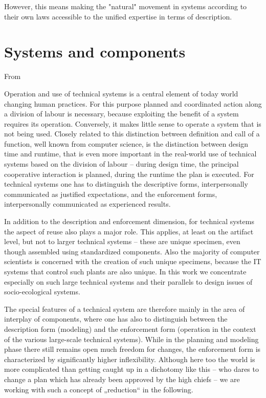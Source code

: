 \documentclass[11pt,a4paper]{article}
\begin{document}
However, this means making the "natural" movement in systems according to
their own laws accessible to the unified expertise in terms of description.

\section{Systems and components}

From \cite{Graebe2020}

Operation and use of technical systems is a central element of today world
changing human practices. For this purpose planned and coordinated action
along a division of labour is necessary, because exploiting the benefit of a
system requires its operation. Conversely, it makes little sense to operate a
system that is not being used. Closely related to this distinction between
definition and call of a function, well known from computer science, is the
distinction between design time and runtime, that is even more important in
the real-world use of technical systems based on the division of labour –
during design time, the principal cooperative interaction is planned, during
the runtime the plan is executed. For technical systems one has to distinguish
the descriptive forms, interpersonally communicated as justified expectations,
and the enforcement forms, interpersonally communicated as experienced
results.

In addition to the description and enforcement dimension, for technical
systems the aspect of reuse also plays a major role. This applies, at least on
the artifact level, but not to larger technical systems – these are unique
specimen, even though assembled using standardized components. Also the
majority of computer scientists is concerned with the creation of such unique
specimens, because the IT systems that control such plants are also unique. In
this work we concentrate especially on such large technical systems and their
parallels to design issues of socio-ecological systems.

The special features of a technical system are therefore mainly in the area of
interplay of components, where one has also to distinguish between the
description form (modeling) and the enforcement form (operation in the context
of the various large-scale technical systems). While in the planning and
modeling phase there still remains open much freedom for changes, the
enforcement form is characterized by significantly higher
inflexibility. Although here too the world is more complicated than getting
caught up in a dichotomy like this – who dares to change a plan which has
already been approved by the high chiefs – we are working with such a concept
of „reduction“ in the following.
\end{document}
